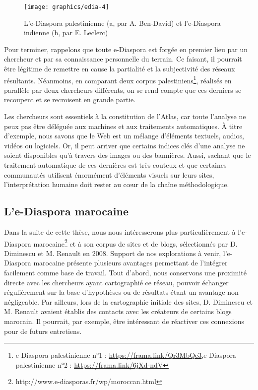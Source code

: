 \documentclass[symmetric,justified,marginals=raggedouter]{tufte-book}
\begin{document}
\begin{figure*}
  \texttt{[image: graphics/edia-4]}
  \caption{L'e-Diaspora palestinienne (a, par A. Ben-David) et l'e-Diaspora indienne (b, par E. Leclerc)}
  \label{fig:edia-4}
\end{figure*} 

\noindent Pour terminer, rappelons que toute e-Diaspora est forgée en premier lieu par un chercheur et par sa connaissance personnelle du terrain. Ce faisant, il pourrait être légitime de remettre en cause la partialité et la subjectivité des réseaux résultants. Néanmoins, en comparant deux corpus palestiniens\footnote{\RaggedOuter e-Diaspora palestinienne n°1 : \url{https://frama.link/Qr3MbQe3},e-Diaspora palestinienne n°2 : \url{https://frama.link/6jXd-ndV}}, réalisés en parallèle par deux chercheurs différents, on se rend compte que ces derniers se recoupent et se recroisent en grande partie. 

Les chercheurs sont essentiels à la constitution de l'Atlas, car toute l'analyse ne peux pas être déléguée aux machines et aux traitements automatiques. À titre d'exemple, nous savons que le Web est un mélange d'éléments textuels, audios, vidéos ou logiciels. Or, il peut arriver que certains indices clés d'une analyse ne soient disponibles qu'à travers des images ou des bannières. Aussi, sachant que le traitement automatique de ces dernières est très couteux \citep{ben-david_colors_2018} et que certaines communautés utilisent énormément d'éléments visuels sur leurs sites, l'interprétation humaine doit rester au cœur de la chaîne méthodologique.

\subsection{L'e-Diaspora marocaine}

\noindent Dans la suite de cette thèse, nous nous intéresserons plus particulièrement à l'e-Diaspora marocaine\footnote{\RaggedOuter http://www.e-diasporas.fr/wp/moroccan.html} et à son corpus de sites et de blogs, sélectionnés par D. Diminescu et M. Renault en 2008. Support de nos explorations à venir, l'e-Diaspora marocaine présente plusieurs avantages permettant de l'intégrer facilement comme base de travail. Tout d'abord, nous conservons une proximité directe avec les chercheurs ayant cartographié ce réseau, pouvoir échanger régulièrement sur la base d'hypothèses ou de résultats étant un avantage non négligeable. Par ailleurs, lors de la cartographie initiale des sites, D. Diminescu et M. Renault avaient établis des contacts avec les créateurs de certains blogs marocain. Il pourrait, par exemple, être intéressant de réactiver ces connexions pour de futurs entretiens.  
\end{document}
